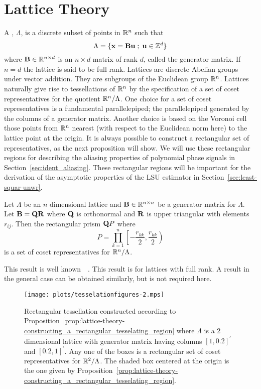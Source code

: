 \documentclass[journal]{IEEEtran}
\begin{document}
\section{Lattice Theory}\label{sec:lattice-theory}

A ,  $\Lambda$, is a discrete subset of points in ${\mathbb R}^n$ such that
\[
   \Lambda = \{\mathbf{x} = \mathbf{B}\mathbf{u} \; ; \; \mathbf{u} \in {\mathbb Z}^d \}
\]
where $\mathbf{B} \in {\mathbb R}^{n \times d}$ is an $n \times d$ matrix of rank $d$, called the generator matrix.  If $n = d$ the lattice is said to be full rank.  Lattices are discrete Abelian groups under vector addition.  They are subgroups of the Euclidean group ${\mathbb R}^n$.  Lattices naturally give rise to tessellations of ${\mathbb R}^n$ by the specification of a set of coset representatives for the quotient ${\mathbb R}^n / \Lambda$.  One choice for a set of coset representatives is a fundamental parallelepiped; the parallelepiped generated by the columns of a generator matrix.  Another choice is based on the Voronoi cell those points from ${\mathbb R}^n$ nearest (with respect to the Euclidean norm here) to the lattice point at the origin.  It is always possible to construct a rectangular set of representatives, as the next proposition will show.  We will use these rectangular regions for describing the aliasing properties of polynomial phase signals in Section~\ref{sec:ident_aliasing}.  These rectangular regions will be important for the derivation of the asymptotic properties of the LSU estimator in Section~\ref{sec:least-squar-unwr}.

\begin{proposition}\label{prop:lattice-theory-constructing_a_rectangular_tesselating_region}
Let  $\Lambda$ be an $n$ dimensional lattice and $\mathbf{B} \in {\mathbb R}^{n\times n}$ be a generator matrix for $\Lambda$. Let $\mathbf{B} = \mathbf{Q}\mathbf{R}$ where $\mathbf{Q}$ is orthonormal and $\mathbf{R}$ is upper triangular with elements $r_{ij}$.  Then the rectangular prism $\mathbf{Q} P$ where
\[
P = \prod_{k=1}^{n}{\left[-\frac{r_{kk}}{2}, \frac{r_{kk}}{2}\right)}
\]
is a set of coset representatives for ${\mathbb R}^n / \Lambda$.
\end{proposition}
\begin{IEEEproof}
This result is well known~\cite[Chapter IX, Theorem IV]{Cassels_geom_numbers_1997}~\cite[Proposition 2.1]{McKilliam2010thesis}.  This result is for lattices with full rank.  A result in the general case can be obtained similarly, but is not required here.  
\end{IEEEproof}

\begin{figure}[tp]
	\centering
		\texttt{[image: plots/tesselationfigures-2.mps]}
		\caption{Rectangular tessellation constructed according to Proposition~\ref{prop:lattice-theory-constructing_a_rectangular_tesselating_region} where $\Lambda$ is a 2 dimensional lattice with generator matrix having columns $[1, 0.2]^\prime$ and $[0.2, 1]^\prime$. Any one of the boxes is a rectangular set of coset representatives for ${\mathbb R}^2 / \Lambda$.  The shaded box centered at the origin is the one given by Proposition~\ref{prop:lattice-theory-constructing_a_rectangular_tesselating_region}.}
		\label{lattices:fig:tessellation2}
\end{figure} 
\end{document}
